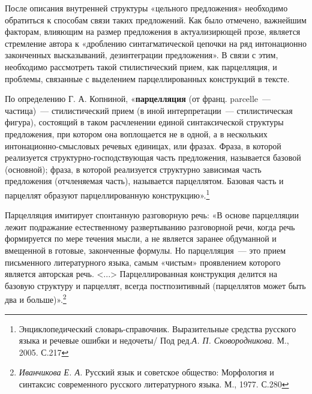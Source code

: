 \documentclass{kursa4}
\begin{document}
{{      После описания внутренней структуры «цельного предложения» необходимо обратиться к способам связи таких предложений. Как было отмечено, важнейшим факторам, влияющим на размер предложения в актуализирющей прозе, является стремление автора к «дроблению синтагматической цепочки на ряд интонационно законченных высказываний, дезинтеграции предложения». В связи с этим, необходимо рассмотреть такой стилистический прием, как парцелляция, и проблемы, связанные с выделением парцеллированных конструкций в тексте. 

      По определению Г. А.
      Копниной, «\textbf{парцелляция} (от франц. parcelle~--- частица)~--- стилистический прием (в иной
      интерпретации~--- стилистическая фигура), состоящий в таком расчленении
      единой синтаксической структуры предложения, при котором она
      воплощается не в одной, а в нескольких интонационно-смысловых речевых
      единицах, или фразах. Фраза, в которой реализуется
      структурно-господствующая часть предложения, называется базовой
      (основной); фраза, в которой реализуется структурно зависимая часть
      предложения (отчленяемая часть), называется парцеллятом. Базовая часть
      и парцеллят образуют парцеллированную
      конструкцию».\footnote{Энциклопедический
      словарь-справочник. Выразительные средства русского языка и речевые
      ошибки и недочеты/ Под ред.\textit{А. П.
      Сковородникова}{. М., 2005. С.217}}

      {Парцелляция имитирует спонтанную разговорную речь:
      «В основе парцелляции лежит подражание естественному развертыванию
      разговорной речи, когда речь формируется по мере течения мысли, а не
      является заранее обдуманной и вмещенной в готовые, законченные формулы.
      Но парцелляция~--- это прием письменного литературного языка, самым
      «чистым» проявлением которого является авторская речь.
      \textless{}...\textgreater{} Парцеллированная конструкция делится на
      базовую структуру и парцеллят, }{всегда
      постпозитивный}{ (парцеллятов может быть два и
      больше)».}\footnote{\textit{{ Иванчикова Е. А.
      }}{Русский язык и советское общество: Морфология и
      синтаксис современного русского литературного языка. М.,
      1977.}\textit{{
      }}{С.280}}{ }

}}
\end{document}
